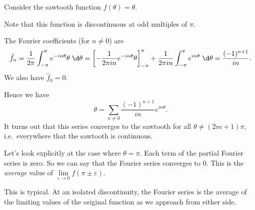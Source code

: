 \documentclass[a4paper]{article}
\begin{document}
\begin{eg}
  Consider the sawtooth function $f(\theta) = \theta$.
  \begin{center}
  \end{center}
  Note that this function is discontinuous at odd multiples of $\pi$.

  The Fourier coefficients (for $n \not= 0$) are
  \[
    \hat{f}_n = \frac{1}{2\pi}\int_{-\pi}^\pi e^{-in\theta}\theta\;\d \theta = \left[-\frac{1}{2\pi i n}e^{-in\theta}\theta\right]_{-\pi}^\pi + \frac{1}{2\pi i n}\int_{-\pi}^\pi e^{in\theta}\;\d \theta = \frac{(-1)^{n + 1}}{in}.
  \]
  We also have $\hat{f}_0 = 0$.

  Hence we have
  \[
    \theta = \sum_{n \not= 0}\frac{(-1)^{n + 1}}{in}e^{in\theta}.
  \]
  It turns out that this series converges to the sawtooth for all $\theta \not= (2m + 1)\pi$, i.e.\ everywhere that the sawtooth is continuous.

  Let's look explicitly at the case where $\theta = \pi$. Each term of the partial Fourier series is zero. So we can say that the Fourier series converges to 0. This is the \emph{average} value of $\lim\limits_{\varepsilon \to 0} f(\pi \pm \varepsilon)$.

  This is typical. At an isolated discontinuity, the Fourier series is the average of the limiting values of the original function as we approach from either side.
\end{eg}
\end{document}
